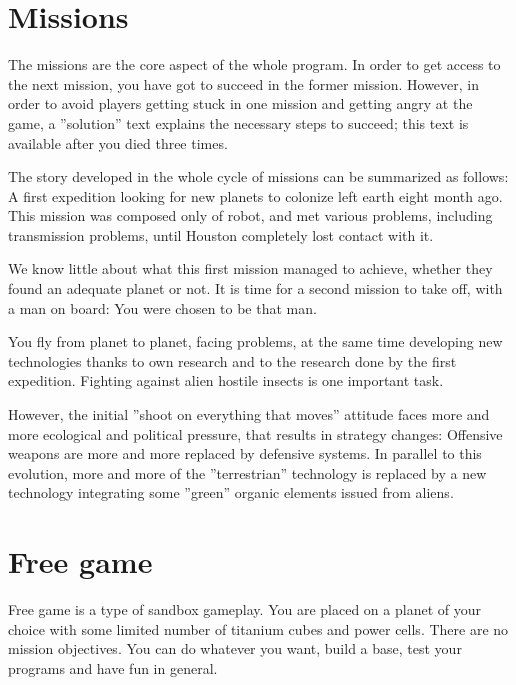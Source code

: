 \chapter{Missions}

The missions are the core aspect of the whole program. In order to get access to the next mission, you have got to succeed in the former mission. However, in order to avoid players getting stuck in one mission and getting angry at the game, a ''solution'' text explains the necessary steps to succeed; this text is available after you died three times.

The story developed in the whole cycle of missions can be summarized as follows: A first expedition looking for new planets to colonize left earth eight month ago. This mission was composed only of robot, and met various problems, including transmission problems, until Houston completely lost contact with it.

We know little about what this first mission managed to achieve, whether they found an adequate planet or not. It is time for a second mission to take off, with a man on board: You were chosen to be that man.

You fly from planet to planet, facing problems, at the same time developing new technologies thanks to own research and to the research done by the first expedition. Fighting against alien hostile insects is one important task.

However, the initial ''shoot on everything that moves'' attitude faces more and more ecological and political pressure, that results in strategy changes: Offensive weapons are more and more replaced by defensive systems. In parallel to this evolution, more and more of the ''terrestrian'' technology is replaced by a new technology integrating some ''green'' organic elements issued from aliens.


\chapter{Free game}

Free game is a type of sandbox gameplay. You are placed on a planet of your choice with some limited number of titanium cubes and power cells. There are no mission objectives. You can do whatever you want, build a base, test your programs and have fun in general.



